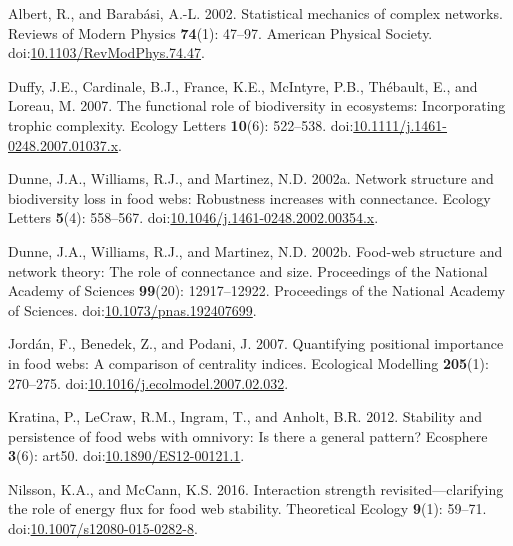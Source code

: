 \documentclass[
]{article}
\newlength{\cslhangindent}
\newenvironment{CSLReferences}[2] %
 {\begin{list}{}{%
  \setlength{\itemindent}{0pt}
  \setlength{\leftmargin}{0pt}
  \setlength{\parsep}{0pt}
  \ifodd #1
   \setlength{\leftmargin}{\cslhangindent}
   \setlength{\itemindent}{-1\cslhangindent}
  \fi
  \setlength{\itemsep}{#2\baselineskip}}}
 {\end{list}}
\begin{document}
\label{refs}
\begin{CSLReferences}{1}{0}
Albert, R., and Barabási, A.-L. 2002. Statistical mechanics of complex
networks. Reviews of Modern Physics \textbf{74}(1): 47--97. American
Physical Society.
doi:\href{https://doi.org/10.1103/RevModPhys.74.47}{10.1103/RevModPhys.74.47}.

Duffy, J.E., Cardinale, B.J., France, K.E., McIntyre, P.B., Thébault,
E., and Loreau, M. 2007. The functional role of biodiversity in
ecosystems: Incorporating trophic complexity. Ecology Letters
\textbf{10}(6): 522--538.
doi:\href{https://doi.org/10.1111/j.1461-0248.2007.01037.x}{10.1111/j.1461-0248.2007.01037.x}.

Dunne, J.A., Williams, R.J., and Martinez, N.D. 2002a. Network structure
and biodiversity loss in food webs: Robustness increases with
connectance. Ecology Letters \textbf{5}(4): 558--567.
doi:\href{https://doi.org/10.1046/j.1461-0248.2002.00354.x}{10.1046/j.1461-0248.2002.00354.x}.

Dunne, J.A., Williams, R.J., and Martinez, N.D. 2002b. Food-web
structure and network theory: {The} role of connectance and size.
Proceedings of the National Academy of Sciences \textbf{99}(20):
12917--12922. Proceedings of the National Academy of Sciences.
doi:\href{https://doi.org/10.1073/pnas.192407699}{10.1073/pnas.192407699}.

Jordán, F., Benedek, Z., and Podani, J. 2007. Quantifying positional
importance in food webs: {A} comparison of centrality indices.
Ecological Modelling \textbf{205}(1): 270--275.
doi:\href{https://doi.org/10.1016/j.ecolmodel.2007.02.032}{10.1016/j.ecolmodel.2007.02.032}.

Kratina, P., LeCraw, R.M., Ingram, T., and Anholt, B.R. 2012. Stability
and persistence of food webs with omnivory: {Is} there a general
pattern? Ecosphere \textbf{3}(6): art50.
doi:\href{https://doi.org/10.1890/ES12-00121.1}{10.1890/ES12-00121.1}.

Nilsson, K.A., and McCann, K.S. 2016. Interaction strength
revisited---clarifying the role of energy flux for food web stability.
Theoretical Ecology \textbf{9}(1): 59--71.
doi:\href{https://doi.org/10.1007/s12080-015-0282-8}{10.1007/s12080-015-0282-8}.


\end{CSLReferences}
\end{document}
